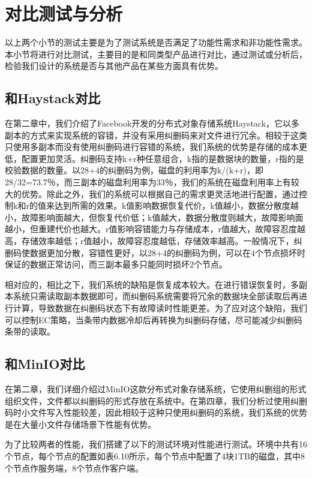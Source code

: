 \section{对比测试与分析}%
以上两个小节的测试主要是为了测试系统是否满足了功能性需求和非功能性需求。本小节将进行对比测试，主要目的是和同类型产品进行对比，通过测试或分析后，检验我们设计的系统是否与其他产品在某些方面具有优势。

\subsection{和Haystack对比}%
在第二章中，我们介绍了Facebook开发的分布式对象存储系统Haystack，它以多副本的方式来实现系统的容错，并没有采用纠删码来对文件进行冗余。相较于这类只使用多副本而没有使用纠删码进行容错的系统，我们系统的优势是存储的成本更低，配置更加灵活。纠删码支持k+r种任意组合，k指的是数据块的数量，r指的是校验数据的数量。以28+4的纠删码为例，磁盘的利用率为k/(k+r)，即28/32=73.7％，而三副本的磁盘利用率为33％，我们的系统在磁盘利用率上有较大的优势。除此之外，我们的系统可以根据自己的需求更灵活地进行配置，通过控制k和r的值来达到所需的效果。k值影响数据恢复代价，k值越小，数据分散度越小，故障影响面越大，但恢复代价低；k值越大，数据分散度则越大，故障影响面越小，但重建代价也越大。r值影响容错能力与存储成本，r值越大，故障容忍度越高，存储效率越低；r值越小，故障容忍度越低，存储效率越高。一般情况下，纠删码使数据更加分散，容错性更好，以28+4的纠删码为例，可以在4个节点损坏时保证的数据正常访问，而三副本最多只能同时损坏2个节点。

相对应的，相比之下，我们系统的缺陷是恢复成本较大。在进行错误恢复时，多副本系统只需读取副本数据即可，而纠删码系统需要将冗余的数据块全部读取后再进行计算，导致数据在纠删码状态下有故障读时性能更差。为了应对这个缺陷，我们可以控制EC策略，当条带内数据冷却后再转换为纠删码存储，尽可能减少纠删码条带的读取。

\subsection{和MinIO对比}%
在第二章，我们详细介绍过MinIO这款分布式对象存储系统，它使用纠删组的形式组织文件，文件都以纠删码的形式存放在系统中。在第四章，我们分析过使用纠删码时小文件写入性能较差，因此相较于这种只使用纠删码的系统，我们系统的优势是在大量小文件存储场景下性能有优势。

为了比较两者的性能，我们搭建了以下的测试环境对性能进行测试。环境中共有16个节点，每个节点的配置如表6.10所示，每个节点中配置了4块1TB的磁盘，其中8个节点作服务端，8个节点作客户端。\newline \newline

